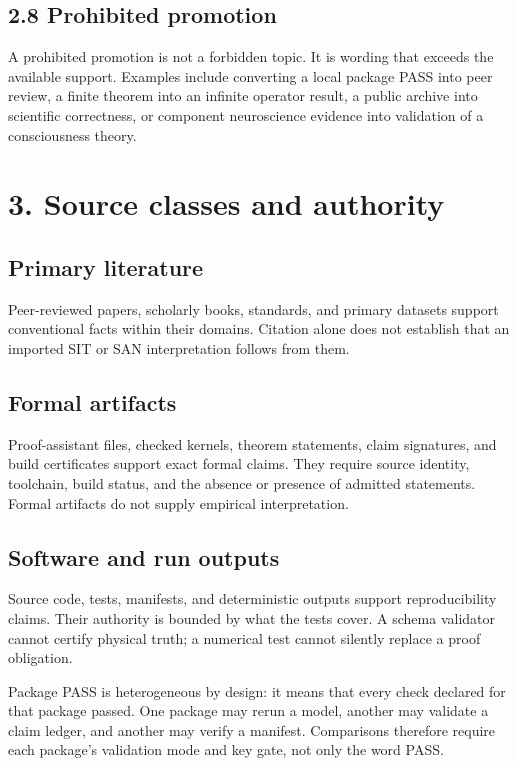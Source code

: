 \documentclass[
  american,
  11pt,
  letterpaper,
]{article}
\begin{document}
\subsection{2.8 Prohibited promotion}\label{prohibited-promotion}

A prohibited promotion is not a forbidden topic. It is wording that exceeds the available support. Examples include converting a local package PASS into peer review, a finite theorem into an infinite operator result, a public archive into scientific correctness, or component neuroscience evidence into validation of a consciousness theory.

\section{3. Source classes and authority}\label{source-classes-and-authority}

\subsection{Primary literature}\label{primary-literature}

Peer-reviewed papers, scholarly books, standards, and primary datasets support conventional facts within their domains. Citation alone does not establish that an imported SIT or SAN interpretation follows from them.

\subsection{Formal artifacts}\label{formal-artifacts}

Proof-assistant files, checked kernels, theorem statements, claim signatures, and build certificates support exact formal claims. They require source identity, toolchain, build status, and the absence or presence of admitted statements. Formal artifacts do not supply empirical interpretation.

\subsection{Software and run outputs}\label{software-and-run-outputs}

Source code, tests, manifests, and deterministic outputs support reproducibility claims. Their authority is bounded by what the tests cover. A schema validator cannot certify physical truth; a numerical test cannot silently replace a proof obligation.

Package PASS is heterogeneous by design: it means that every check declared for that package passed. One package may rerun a model, another may validate a claim ledger, and another may verify a manifest. Comparisons therefore require each package's validation mode and key gate, not only the word PASS.
\end{document}
